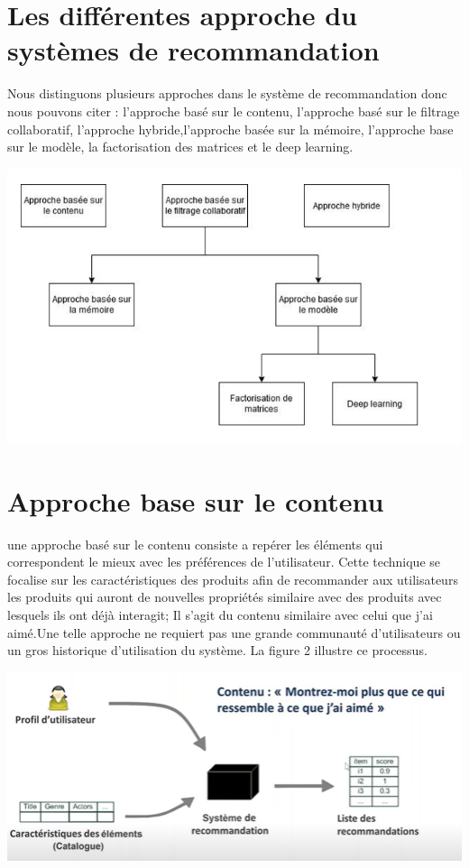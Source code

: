 \documentclass[12pt,a4paper]{article}
\begin{document}
\section{Les différentes approche du systèmes de recommandation }	

Nous distinguons plusieurs approches dans le système de recommandation  donc nous pouvons citer : l'approche basé sur le contenu, l'approche basé sur le filtrage collaboratif, l'approche hybride,l'approche basée sur la mémoire, l'approche base sur le modèle, la factorisation des matrices et le deep learning. 

\includegraphics[width=1\linewidth]{Capture 3}


 
\section{Approche base sur le contenu}	
 une approche basé sur le contenu consiste a repérer les éléments qui correspondent le mieux avec les préférences de l'utilisateur. Cette technique se focalise sur les caractéristiques des produits afin de recommander aux utilisateurs les produits qui auront de nouvelles propriétés 
similaire avec des produits avec lesquels ils ont déjà interagit; Il s'agit du contenu similaire avec celui que j'ai aimé.Une telle approche ne requiert pas une grande communauté d’utilisateurs ou un gros historique d'utilisation du système. La figure 2 illustre ce processus.

\includegraphics[width=1.1\linewidth]{Capture 1}
\end{document}
